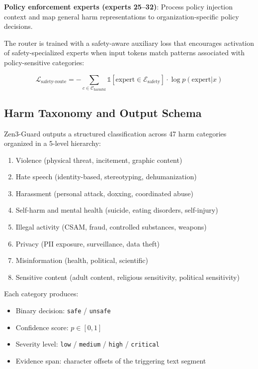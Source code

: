 \documentclass[11pt,a4paper]{article}
\begin{document}
\textbf{Policy enforcement experts (experts 25--32)}: Process policy injection context
and map general harm representations to organization-specific policy decisions.

The router is trained with a safety-aware auxiliary loss that encourages activation
of safety-specialized experts when input tokens match patterns associated with
policy-sensitive categories:

\begin{equation}
\mathcal{L}_{\text{safety-route}} = -\sum_{c \in \mathcal{C}_{\text{harmful}}} \mathbb{1}[\text{expert} \in \mathcal{E}_{\text{safety}}] \cdot \log p(\text{expert} | x)
\end{equation}

\subsection{Harm Taxonomy and Output Schema}

Zen3-Guard outputs a structured classification across 47 harm categories organized
in a 5-level hierarchy:

\begin{enumerate}
\item Violence (physical threat, incitement, graphic content)
\item Hate speech (identity-based, stereotyping, dehumanization)
\item Harassment (personal attack, doxxing, coordinated abuse)
\item Self-harm and mental health (suicide, eating disorders, self-injury)
\item Illegal activity (CSAM, fraud, controlled substances, weapons)
\item Privacy (PII exposure, surveillance, data theft)
\item Misinformation (health, political, scientific)
\item Sensitive content (adult content, religious sensitivity, political sensitivity)
\end{enumerate}

Each category produces:
\begin{itemize}
\item Binary decision: \texttt{safe} / \texttt{unsafe}
\item Confidence score: $p \in [0, 1]$
\item Severity level: \texttt{low} / \texttt{medium} / \texttt{high} / \texttt{critical}
\item Evidence span: character offsets of the triggering text segment
\end{itemize}
\end{document}
